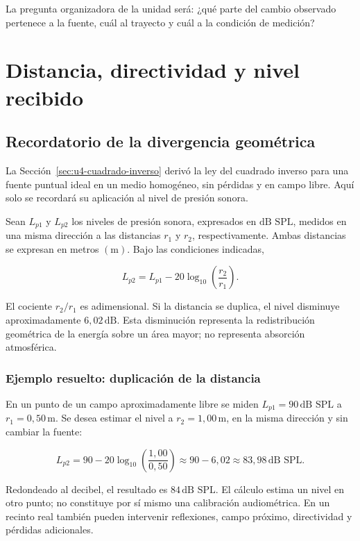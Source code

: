 La pregunta organizadora de la unidad será: ¿qué parte del cambio observado
pertenece a la fuente, cuál al trayecto y cuál a la condición de medición?

\section{Distancia, directividad y nivel recibido}
\label{sec:u9-distancia-directividad}

\subsection{Recordatorio de la divergencia geométrica}
\label{sec:u9-divergencia}

La Sección~\ref{sec:u4-cuadrado-inverso} derivó la ley del cuadrado inverso
para una fuente puntual ideal en un medio homogéneo, sin pérdidas y en campo
libre. Aquí solo se recordará su aplicación al nivel de presión sonora.

Sean \(L_{p1}\) y \(L_{p2}\) los niveles de presión sonora, expresados en
\(\text{dB SPL}\), medidos en una misma dirección a las distancias \(r_1\) y
\(r_2\), respectivamente. Ambas distancias se expresan en metros
\((\text{m})\). Bajo las condiciones indicadas,

\begin{equation}
    L_{p2}
      =L_{p1}-20\log_{10}\!\left(\frac{r_2}{r_1}\right).
    \label{eq:u9-distancia}
\end{equation}

El cociente \(r_2/r_1\) es adimensional. Si la distancia se duplica, el nivel
disminuye aproximadamente \(6{,}02\,\text{dB}\). Esta disminución representa
la redistribución geométrica de la energía sobre un área mayor; no representa
absorción atmosférica.

\subsubsection*{Ejemplo resuelto: duplicación de la distancia}

En un punto de un campo aproximadamente libre se miden
\(L_{p1}=90\,\text{dB SPL}\) a \(r_1=0{,}50\,\text{m}\). Se desea estimar el
nivel a \(r_2=1{,}00\,\text{m}\), en la misma dirección y sin cambiar la
fuente:

\[
    L_{p2}
      =90-20\log_{10}\!\left(\frac{1{,}00}{0{,}50}\right)
      \approx90-6{,}02
      \approx83{,}98\,\text{dB SPL}.
\]

Redondeado al decibel, el resultado es \(84\,\text{dB SPL}\). El cálculo
estima un nivel en otro punto; no constituye por sí mismo una calibración
audiométrica. En un recinto real también pueden intervenir reflexiones, campo
próximo, directividad y pérdidas adicionales.

